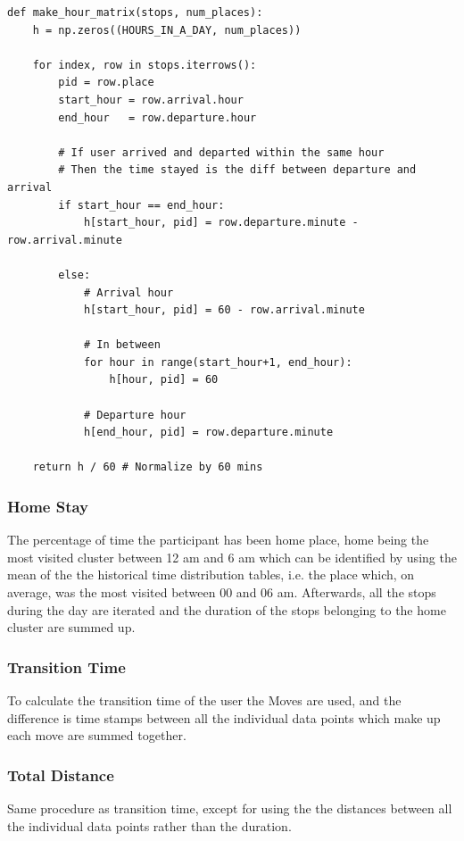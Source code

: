 \begin{verbatim}
def make_hour_matrix(stops, num_places):
    h = np.zeros((HOURS_IN_A_DAY, num_places))
    
    for index, row in stops.iterrows():
        pid = row.place
        start_hour = row.arrival.hour
        end_hour   = row.departure.hour
        
        # If user arrived and departed within the same hour
        # Then the time stayed is the diff between departure and arrival
        if start_hour == end_hour:
            h[start_hour, pid] = row.departure.minute - row.arrival.minute
        
        else:
            # Arrival hour
            h[start_hour, pid] = 60 - row.arrival.minute

            # In between
            for hour in range(start_hour+1, end_hour):
                h[hour, pid] = 60

            # Departure hour
            h[end_hour, pid] = row.departure.minute
        
    return h / 60 # Normalize by 60 mins
\end{verbatim}



\subsubsection{Home Stay} 
The percentage of time the participant has been home place, home being the most visited cluster between 12 am and 6 am which can be identified by using the mean of the the historical time distribution tables, i.e. the place which, on average, was the most visited between 00 and 06 am. Afterwards, all the stops during the day are iterated and the duration of the stops belonging to the home cluster are summed up.

\subsubsection{Transition Time} 
To calculate the transition time of the user the Moves are used, and the difference is time stamps between all the individual data points which make up each move are summed together. 

\subsubsection{Total Distance} 
Same procedure as transition time, except for using the the distances between all the individual data points rather than the duration.


